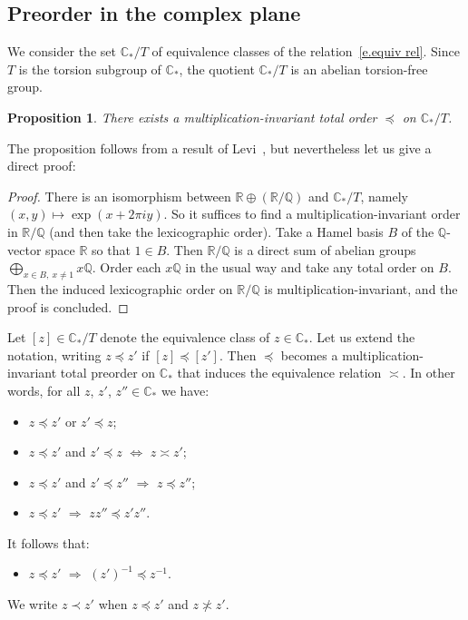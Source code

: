 \documentclass[10pt, a4paper]{amsart}
\theoremstyle{plain}
\newtheorem{prop}[lemma]{Proposition}
\theoremstyle{definition}
\theoremstyle{remark}
\theoremstyle{note}
\numberwithin{equation}{section}
\begin{document}
\subsection{Preorder in the complex plane}\label{ss.preorder}

We consider the set ${\mathbb{C}}_* / T$ of equivalence classes 
of the relation~\eqref{e.equiv rel}.
Since $T$ is the torsion subgroup of ${\mathbb{C}}_*$,
the quotient ${\mathbb{C}}_* / T$ is an abelian torsion-free group.

\begin{prop}
There exists a multiplication-invariant total order $\preccurlyeq$  on ${\mathbb{C}}_* / T$. 
\end{prop}

The proposition follows from a result of Levi~\cite{Levi},
but nevertheless let us give a direct proof:

\begin{proof}
There is an isomorphism between ${\mathbb{R}} \oplus ({\mathbb{R}} / {\mathbb{Q}})$ and ${\mathbb{C}}_*/T$, namely
$(x,y) \mapsto \exp(x + 2\pi i y)$. 
So it suffices to find a multiplication-invariant order in ${\mathbb{R}}/{\mathbb{Q}}$
(and then take the lexicographic order).
Take a Hamel basis $B$ of the ${\mathbb{Q}}$-vector space ${\mathbb{R}}$ so that $1 \in B$.
Then ${\mathbb{R}}/{\mathbb{Q}}$ is a direct sum of abelian groups $\bigoplus_{x\in B, \ x \neq 1} x{\mathbb{Q}}$.
Order each $x{\mathbb{Q}}$ in the usual way and take any total order on $B$.
Then the induced lexicographic order on ${\mathbb{R}}/{\mathbb{Q}}$ is multiplication-invariant,
and the proof is concluded.
\end{proof}

Let $[z]\in {\mathbb{C}}_*/T$ denote the equivalence class of $z\in {\mathbb{C}}_*$.
Let us extend the notation, writing $z \preccurlyeq z'$ if $[z] \preccurlyeq [z']$.
Then $\preccurlyeq$ becomes a multiplication-invariant total preorder on ${\mathbb{C}}_*$ 
that induces the equivalence relation $\asymp$.
In other words, for all $z$, $z'$, $z'' \in {\mathbb{C}}_*$ we have:
\begin{itemize}
	\item $z \preccurlyeq z'$ or $z' \preccurlyeq z$;
	\item $z \preccurlyeq z'$ and $z' \preccurlyeq z$ $\Longleftrightarrow$ $z \asymp z'$;
	\item $z \preccurlyeq z'$ and $z' \preccurlyeq z''$ $\Longrightarrow$ $z \preccurlyeq z''$;
	\item $z \preccurlyeq z'$ $\Longrightarrow$ $z z'' \preccurlyeq z' z''$.
\end{itemize}
It follows that:
\begin{itemize}
	\item $z \preccurlyeq z'$ $\Longrightarrow$ $(z')^{-1} \preccurlyeq z^{-1}$.
\end{itemize}
We write $z \prec z'$ when $z \preccurlyeq z'$ and $z \not \asymp z'$.
\end{document}
